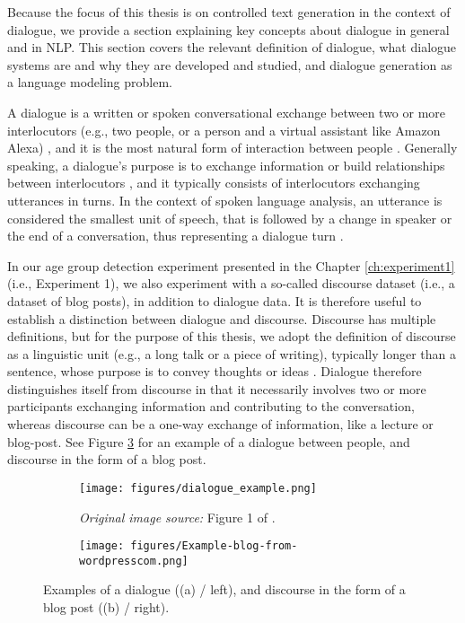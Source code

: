 Because the focus of this thesis is on controlled text generation in the context of dialogue, we provide a section explaining key concepts about dialogue in general and in NLP. This section covers the relevant definition of dialogue, what dialogue systems are and why they are developed and studied, and dialogue generation as a language modeling problem.

A dialogue is a written or spoken conversational exchange between two or more interlocutors (e.g., two people, or a person and a virtual assistant like Amazon Alexa) \citep{MerriamWebster2021Dialogue_Entry}, and it is the most natural form of interaction between people \citep{burtsev-etal-2018-deeppavlov}.
Generally speaking, a dialogue's purpose is to exchange information or build relationships between interlocutors \citep{bohm2013dialogue}, and it typically consists of interlocutors exchanging utterances in turns. In the context of spoken language analysis, an utterance is considered the smallest unit of speech, that is followed by a change in speaker or the end of a conversation, thus representing a dialogue turn \citep{traum1996utterance}.

In our age group detection experiment presented in the Chapter \ref{ch:experiment1} (i.e., Experiment 1), we also experiment with a so-called discourse dataset (i.e., a dataset of blog posts), in addition to dialogue data. It is therefore useful to establish a distinction between dialogue and discourse. Discourse has multiple definitions, but for the purpose of this thesis, we adopt the definition of discourse as a linguistic unit (e.g., a long talk or a piece of writing), typically longer than a sentence, whose purpose is to convey thoughts or ideas \citep{MerriamWebster2021Dialogue_Entry}. Dialogue therefore distinguishes itself from discourse in that it necessarily involves two or more participants exchanging information and contributing to the conversation, whereas discourse can be a one-way exchange of information, like a lecture or blog-post. See Figure \ref{fig:examples_dialogue_blog_post} for an example of a dialogue between people, and discourse in the form of a blog post.


\begin{figure}[H]
     \centering
     \begin{subfigure}[b]{0.45\textwidth}
        \centering
        \texttt{[image: figures/dialogue\_example.png]}
        \caption{\textit{Original image source:} Figure 1 of \cite{liu-etal-2020-impress}.}
        \label{}
     \end{subfigure}
     \hfill
     \begin{subfigure}[b]{0.45\textwidth}
        \centering
        \texttt{[image: figures/Example-blog-from-wordpresscom.png]}
        \caption{}
        \label{}
     \end{subfigure}
        \caption{Examples of a dialogue ((a) / left), and discourse in the form of a blog post ((b) / right).}
        \label{fig:examples_dialogue_blog_post}
\end{figure}

